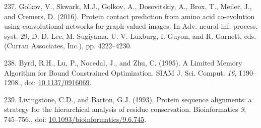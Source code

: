 \documentclass[11pt,a4paper,twoside]{book}
\theoremstyle{definition}
\theoremstyle{definition}
\theoremstyle{remark}
\begin{document}
\hypertarget{ref-Golkov2016a}{}
237. Golkov, V., Skwark, M.J., Golkov, A., Dosovitskiy, A., Brox, T.,
Meiler, J., and Cremers, D. (2016). Protein contact prediction from
amino acid co-evolution using convolutional networks for graph-valued
images. In Adv. neural inf. process. syst. 29, D. D. Lee, M. Sugiyama,
U. V. Luxburg, I. Guyon, and R. Garnett, eds. (Curran Associates, Inc.),
pp. 4222--4230.

\hypertarget{ref-Byrd1995}{}
238. Byrd, R.H., Lu, P., Nocedal, J., and Zhu, C. (1995). A Limited
Memory Algorithm for Bound Constrained Optimization. SIAM J. Sci.
Comput. \emph{16}, 1190--1208., doi:
\href{https://doi.org/10.1137/0916069}{10.1137/0916069}.

\hypertarget{ref-Livingstone1993}{}
239. Livingstone, C.D., and Barton, G.J. (1993). Protein sequence
alignments: a strategy for the hierarchical analysis of residue
conservation. Bioinformatics \emph{9}, 745--756., doi:
\href{https://doi.org/10.1093/bioinformatics/9.6.745}{10.1093/bioinformatics/9.6.745}.
\end{document}
